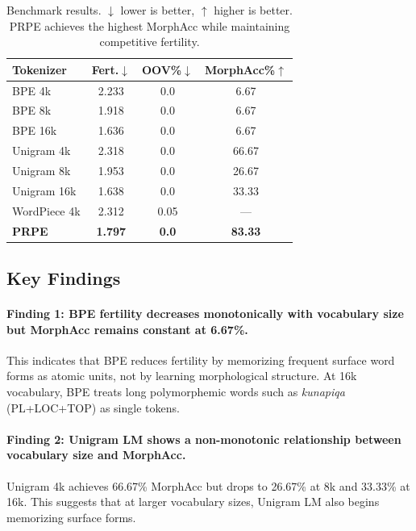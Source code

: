 \documentclass[11pt]{article}
\begin{document}
\begin{table}[h]
\centering
\small
\begin{tabular}{lccc}
\toprule
\textbf{Tokenizer} & \textbf{Fert.$\downarrow$} & \textbf{OOV\%$\downarrow$} & \textbf{MorphAcc\%$\uparrow$} \\
\midrule
BPE 4k      & 2.233 & 0.0 & 6.67  \\
BPE 8k      & 1.918 & 0.0 & 6.67  \\
BPE 16k     & 1.636 & 0.0 & 6.67  \\
Unigram 4k  & 2.318 & 0.0 & 66.67 \\
Unigram 8k  & 1.953 & 0.0 & 26.67 \\
Unigram 16k & 1.638 & 0.0 & 33.33 \\
WordPiece 4k& 2.312 & 0.05 & ---  \\
\midrule
\textbf{PRPE}        & \textbf{1.797} & \textbf{0.0} & \textbf{83.33} \\
\bottomrule
\end{tabular}
\caption{Benchmark results. $\downarrow$ lower is better, $\uparrow$ higher is better. PRPE achieves the highest MorphAcc while maintaining competitive fertility.}
\label{tab:results}
\end{table}

\subsection{Key Findings}

\paragraph{Finding 1: BPE fertility decreases monotonically with vocabulary size but MorphAcc remains constant at 6.67\%.} This indicates that BPE reduces fertility by memorizing frequent surface word forms as atomic units, not by learning morphological structure. At 16k vocabulary, BPE treats long polymorphemic words such as \textit{kunapiqa} (PL+LOC+TOP) as single tokens.

\paragraph{Finding 2: Unigram LM shows a non-monotonic relationship between vocabulary size and MorphAcc.} Unigram 4k achieves 66.67\% MorphAcc but drops to 26.67\% at 8k and 33.33\% at 16k. This suggests that at larger vocabulary sizes, Unigram LM also begins memorizing surface forms.
\end{document}
